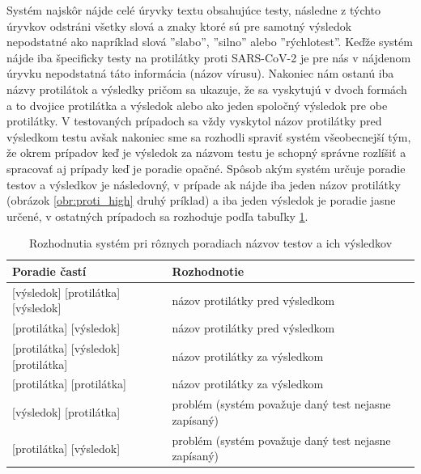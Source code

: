 Systém najskôr nájde celé úryvky textu obsahujúce testy, následne z týchto úryvkov odstráni všetky slová a znaky ktoré sú pre samotný výsledok nepodstatné ako napríklad slová ''slabo'', ''silno'' alebo ''rýchlotest''. Keďže systém nájde iba špecificky testy na protilátky proti SARS-CoV-2 je pre nás v nájdenom úryvku nepodstatná táto informácia (názov vírusu). Nakoniec nám ostanú iba názvy protilátok a výsledky pričom sa ukazuje, že sa vyskytujú v dvoch formách a to dvojice protilátka a výsledok alebo ako jeden spoločný výsledok pre obe protilátky. V testovaných prípadoch sa vždy vyskytol názov protilátky pred výsledkom testu avšak nakoniec sme sa rozhodli spraviť systém všeobecnejší tým, že okrem prípadov keď je výsledok za názvom testu je schopný správne rozlíšiť a spracovať aj prípady keď je poradie opačné. Spôsob akým systém určuje poradie testov a výsledkov je následovný, v prípade ak nájde iba jeden názov protilátky (obrázok \ref{obr:proti_high} druhý príklad) a iba jeden výsledok je poradie jasne určené, v ostatných prípadoch sa rozhoduje podľa tabuľky \ref{tab:proti}.

\begin{table}[]
	\caption[Rozhodia systému pri testoch]{Rozhodnutia systém pri rôznych poradiach názvov testov a ich výsledkov}
	\label{tab:proti}
	\begin{tabular}{|p{8cm}|p{6.7cm}|}
		\hline
		\textbf{Poradie častí}                          & \textbf{Rozhodnotie}                                                                                             \\ \hline
		[protilátka] [výsledok] [protilátka] [výsledok] & názov protilátky pred výsledkom                                                                        \\ \hline
		[protilátka] [protilátka] [výsledok]            & názov protilátky pred výsledkom                                                                        \\ \hline
		[výsledok] [protilátka] [výsledok] [protilátka] & názov protilátky za výsledkom                                                                          \\ \hline
		[výsledok] [protilátka] [protilátka]            & názov protilátky za výsledkom                                                                          \\ \hline
		[protilátka] [výsledok] [protilátka]            & problém (systém považuje daný test nejasne zapísaný)          \\ \hline
		[výsledok] [protilátka] [výsledok]              & problém (systém považuje daný test nejasne zapísaný) \\ \hline
	\end{tabular}
\end{table}

